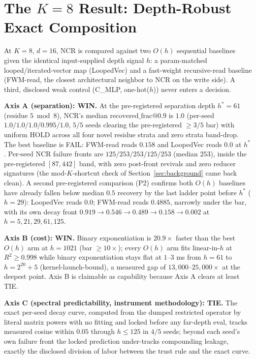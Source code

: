 \section{The $K{=}8$ Result: Depth-Robust Exact Composition}
\label{sec:win}

At $K{=}8$, $d{=}16$, NCR is compared against two $O(h)$ sequential
baselines given the identical input-supplied depth signal $h$: a
param-matched looped/iterated-vector map (LoopedVec) and a fast-weight
recursive-read baseline (FWM-read, the closest architectural neighbor to
NCR on the write side). A third, disclosed weak control (C\_MLP,
one-hot($h$)) never enters a decision. %

\textbf{Axis A (separation): WIN.} At the pre-registered separation depth
$h^\ast{=}61$ (residue $5 \bmod 8$), NCR's median
$\mathrm{recovered\_frac@0.9}$ is $1.0$ (per-seed $1.0/1.0/1.0/0.995/1.0$,
$5/5$ seeds clearing the pre-registered $\geq 3/5$ bar) with uniform HOLD
across all four novel residue strata and zero strata band-drop. The best
baseline is FAIL: FWM-read reads $0.158$ and LoopedVec reads $0.0$ at
$h^\ast$. Per-seed NCR failure fronts are $125/253/253/125/253$ (median
$253$), inside the pre-registered $[87,442]$ band, with zero post-front
revivals and zero reducer signatures (the mod-$K$-shortcut check of
Section~\ref{sec:background} came back clean).
A second pre-registered comparison (P2) confirms both $O(h)$ baselines
have already fallen below median $0.5$ recovery by the last ladder point
before $h^\ast$ ($h{=}29$): LoopedVec reads $0.0$; FWM-read reads
$0.4885$, narrowly under the bar, with its own decay front
$0.919{\to}0.546{\to}0.489{\to}0.158{\to}0.002$ at $h{=}5,21,29,61,125$.

\textbf{Axis B (cost): WIN.} Binary exponentiation is $20.9\times$ faster
than the best $O(h)$ arm at $h{=}1021$ (bar $\geq 10\times$); every $O(h)$
arm fits linear-in-$h$ at $R^2 \geq 0.998$ while binary exponentiation
stays flat at $1$--$3$ ms from $h{=}61$ to $h{=}2^{20}{+}5$
(kernel-launch-bound), a measured gap of $13{,}000$--$25{,}000\times$ at
the deepest point. Axis B is claimable as capability because Axis A
clears at least TIE. %

\textbf{Axis C (spectral predictability, instrument methodology): TIE.}
The exact per-seed decay curve, computed from the dumped restricted
operator by literal matrix powers with no fitting and locked before any
far-depth eval, tracks measured cosine within $0.05$ through $h \leq 125$
in $4/5$ seeds; beyond each seed's own failure front the locked
prediction under-tracks compounding leakage, exactly the disclosed
division of labor between the trust rule and the exact curve.

